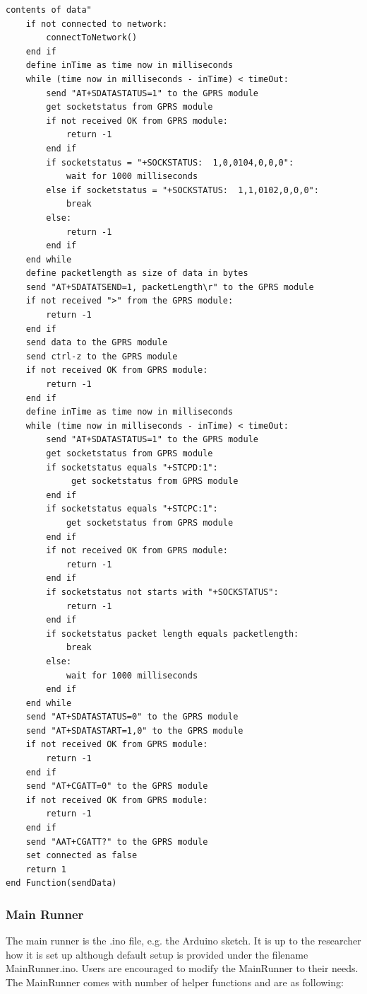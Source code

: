 \begin{lstlisting}[frame=single, label=pseodoGprsGateway, caption={Pseudocode of GprsGateway connectToNetwork() and sendData() functions}]
                    contents of data"
    if not connected to network:
        connectToNetwork()
    end if
    define inTime as time now in milliseconds
    while (time now in milliseconds - inTime) < timeOut:
        send "AT+SDATASTATUS=1" to the GPRS module
        get socketstatus from GPRS module
        if not received OK from GPRS module:
            return -1
        end if
        if socketstatus = "+SOCKSTATUS:  1,0,0104,0,0,0":
            wait for 1000 milliseconds
        else if socketstatus = "+SOCKSTATUS:  1,1,0102,0,0,0":
            break
        else:
            return -1
        end if
    end while
    define packetlength as size of data in bytes
    send "AT+SDATATSEND=1, packetLength\r" to the GPRS module
    if not received ">" from the GPRS module:
        return -1
    end if
    send data to the GPRS module
    send ctrl-z to the GPRS module
    if not received OK from GPRS module:
        return -1
    end if    
    define inTime as time now in milliseconds
    while (time now in milliseconds - inTime) < timeOut:
        send "AT+SDATASTATUS=1" to the GPRS module
        get socketstatus from GPRS module
        if socketstatus equals "+STCPD:1":
             get socketstatus from GPRS module
        end if
        if socketstatus equals "+STCPC:1":
            get socketstatus from GPRS module
        end if
        if not received OK from GPRS module:
            return -1
        end if
        if socketstatus not starts with "+SOCKSTATUS":
            return -1
        end if
        if socketstatus packet length equals packetlength:
            break
        else:
            wait for 1000 milliseconds
        end if
    end while
    send "AT+SDATASTATUS=0" to the GPRS module
    send "AT+SDATASTART=1,0" to the GPRS module
    if not received OK from GPRS module:
        return -1
    end if
    send "AT+CGATT=0" to the GPRS module
    if not received OK from GPRS module:
        return -1
    end if
    send "AAT+CGATT?" to the GPRS module
    set connected as false
    return 1
end Function(sendData)
\end{lstlisting}

\subsubsection{Main Runner}
The main runner is the .ino file, e.g. the Arduino sketch. It is up to the researcher
how it is set up although default setup is provided under the filename MainRunner.ino. 
Users are encouraged to modify the MainRunner to their needs. The MainRunner comes 
with number of helper functions and are as following:

